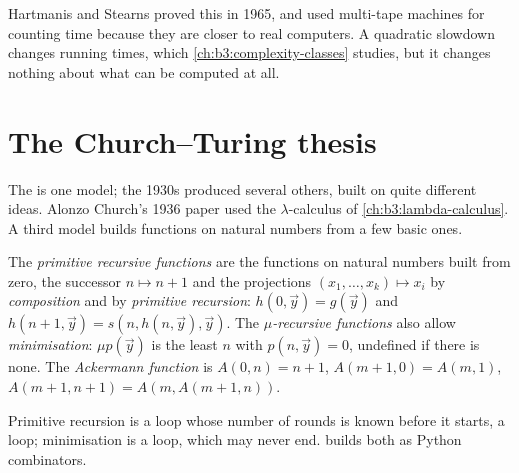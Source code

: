 Hartmanis and Stearns proved this in 1965, and used multi-tape machines for counting time because they are closer to real computers. %
A quadratic slowdown changes running times, which \cref{ch:b3:complexity-classes} studies, but it changes nothing about what can be computed at all.

\section{The Church--Turing thesis}\label{sec:b3:computability:thesis}

The  is one model; the 1930s produced several others, built on quite different ideas. Alonzo Church's 1936 paper used the \(\lambda\)-calculus of \cref{ch:b3:lambda-calculus}. %
A third model builds functions on natural numbers from a few basic ones.

\begin{definition}\label{def:b3:computability:recursive}
The \emph{primitive recursive functions} are the functions on natural numbers built from zero, the successor $n \mapsto n + 1$ and the projections $(x_1, \ldots, x_k) \mapsto x_i$ by \emph{composition} and by \emph{primitive recursion}: $h(0, \vec y) = g(\vec y)$ and $h(n + 1, \vec y) = s(n, h(n, \vec y), \vec y)$. The \emph{\(\mu\)-recursive functions} also allow \emph{minimisation}: $\mu p(\vec y)$ is the least $n$ with $p(n, \vec y) = 0$, undefined if there is none. The \emph{Ackermann function} is $A(0, n) = n + 1$, $A(m + 1, 0) = A(m, 1)$, $A(m + 1, n + 1) = A(m, A(m + 1, n))$.
\end{definition}

Primitive recursion is a loop whose number of rounds is known before it starts, a  loop; minimisation is a  loop, which may never end.  builds both as Python combinators.

\label{lst:b3:computability:primrec}

\label{out:b3:computability:primrec}

